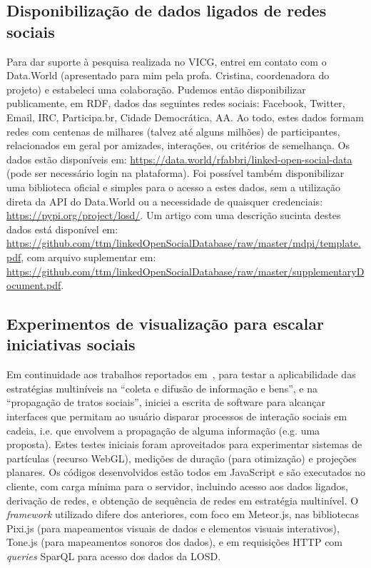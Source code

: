 \documentclass[a4paper, 11pt]{article}
\begin{document}
\subsection{Disponibilização de dados ligados de redes sociais}
Para dar suporte à pesquisa realizada no VICG, entrei em contato com o
Data.World (apresentado para mim pela profa. Cristina, coordenadora do projeto)
e estabeleci uma colaboração.
Pudemos então disponibilizar publicamente, em RDF, dados das seguintes redes sociais:
Facebook, Twitter, Email, IRC, Participa.br, Cidade Democrática, AA.
Ao todo, estes dados formam redes com centenas de milhares (talvez até alguns milhões)
de participantes, relacionados em geral por amizades, interações, ou critérios de semelhança.
Os dados estão disponíveis em:
\url{https://data.world/rfabbri/linked-open-social-data} (pode ser necessário login na plataforma).
Foi possível também disponibilizar uma biblioteca oficial e simples para o acesso a estes dados,
sem a utilização direta da API do Data.World ou a necessidade de quaisquer credenciais:
\url{https://pypi.org/project/losd/}.
Um artigo com uma descrição sucinta destes dados está disponível em:
\url{https://github.com/ttm/linkedOpenSocialDatabase/raw/master/mdpi/template.pdf},
com arquivo suplementar em:
\url{https://github.com/ttm/linkedOpenSocialDatabase/raw/master/supplementaryDocument.pdf}.


\subsection{Experimentos de visualização para escalar iniciativas sociais}
Em continuidade aos trabalhos reportados em~\cite{tese,virus,sfvideo},
para testar a aplicabilidade das estratégias multiníveis na ``coleta e difusão de informação e bens'',
e na ``propagação de tratos sociais'', iniciei a escrita de software para alcançar interfaces
que permitam ao usuário disparar processos de interação sociais em cadeia, i.e. que envolvem
a propagação de alguma informação (e.g. uma proposta).
Estes testes iniciais foram aproveitados para experimentar sistemas de partículas (recurso WebGL),
medições de duração (para otimização) e projeções planares.
Os códigos desenvolvidos estão todos em JavaScript e são executados no cliente,
com carga mínima para o servidor,
incluindo acesso aos dados ligados, derivação de redes, e obtenção de sequência de redes
em estratégia multinível.
O \emph{framework} utilizado difere dos anteriores, com foco em Meteor.js,
nas bibliotecas Pixi.js (para mapeamentos visuais de dados e elementos visuais interativos),
Tone.js (para mapeamentos sonoros dos dados),
e em requisições HTTP com \emph{queries} SparQL para acesso dos dados da LOSD.
\end{document}
